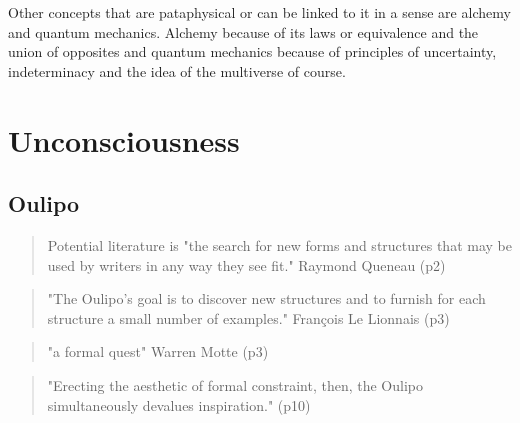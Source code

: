Other concepts that are pataphysical or can be linked to it in a sense are alchemy and quantum mechanics. Alchemy because of its laws or equivalence and the union of opposites \citep{Hugill2012} and quantum mechanics because of principles of uncertainty, indeterminacy and the idea of the multiverse of course.

\section{Unconsciousness}


\subsection{Oulipo}


\begin{quote}
  Potential literature is "the search for new forms and structures that may be used by writers in any way they see fit." Raymond Queneau (p2)
\end{quote}

\begin{quote}
  "The Oulipo's goal is to discover new structures and to furnish for each structure a small number of examples." François Le Lionnais (p3)
\end{quote}

\begin{quote}
  "a formal quest" Warren Motte (p3)
\end{quote}

\begin{quote}
  "Erecting the aesthetic of formal constraint, then, the Oulipo simultaneously devalues inspiration." (p10)
\end{quote}


